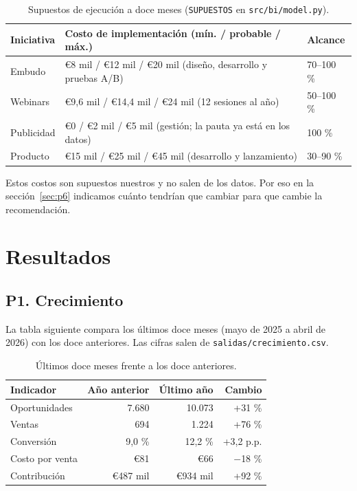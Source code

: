 \documentclass[11pt,letterpaper]{article}
\begin{document}
\begin{table}[!htbp]
\centering
\caption{Supuestos de ejecución a doce meses (\texttt{SUPUESTOS} en \texttt{src/bi/model.py}).}
\begin{tabularx}{\linewidth}{l L l}
\toprule
Iniciativa & Costo de implementación (mín. / probable / máx.) & Alcance \\
\midrule
Embudo & €8 mil / €12 mil / €20 mil (diseño, desarrollo y pruebas A/B) & 70--100 \% \\
Webinars & €9,6 mil / €14,4 mil / €24 mil (12 sesiones al año) & 50--100 \% \\
Publicidad & €0 / €2 mil / €5 mil (gestión; la pauta ya está en los datos) & 100 \% \\
Producto & €15 mil / €25 mil / €45 mil (desarrollo y lanzamiento) & 30--90 \% \\
\bottomrule
\end{tabularx}
\end{table}

Estos costos son supuestos nuestros y no salen de los datos. Por eso en la sección~\ref{sec:p6} indicamos cuánto
tendrían que cambiar para que cambie la recomendación.

\section{Resultados}
\label{sec:resultados}

\subsection{P1. Crecimiento}

La tabla siguiente compara los últimos doce meses (mayo de 2025 a abril de 2026) con los doce
anteriores. Las cifras salen de \texttt{salidas/crecimiento.csv}.

\begin{table}[!htbp]
\centering
\caption{Últimos doce meses frente a los doce anteriores.}
\begin{tabular}{l r r r}
\toprule
Indicador & Año anterior & Último año & Cambio \\
\midrule
Oportunidades & 7.680 & 10.073 & +31 \% \\
Ventas & 694 & 1.224 & +76 \% \\
Conversión & 9,0 \% & 12,2 \% & +3,2 p.p. \\
Costo por venta & €81 & €66 & $-$18 \% \\
Contribución & €487 mil & €934 mil & +92 \% \\
\bottomrule
\end{tabular}
\end{table}
\end{document}
